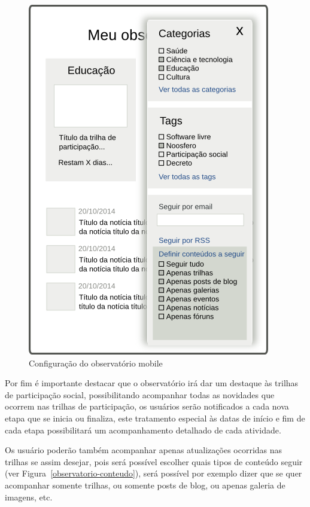\documentclass[12pt]{article}
\begin{document}
\begin{figure}[h!]
\center
\includegraphics[scale=0.50]{observatorio-mobile-opcoes.png}
\caption{Configuração do observatório mobile}
\label{observatorio-mobile-opcoes}
\end{figure}

Por fim é importante destacar que o observatório irá dar um destaque às
trilhas de participação social, possibilitando acompanhar todas as novidades
que ocorrem nas trilhas de participação, os usuários serão notificados a cada
nova etapa que se inicia ou finaliza, este tratamento especial às datas de
início e fim de cada etapa possibilitará um acompanhamento detalhado de cada
atividade.

Os usuário poderão também acompanhar apenas atualizações ocorridas nas trilhas
se assim desejar, pois será possível escolher quais tipos de conteúdo seguir
(ver Figura~\ref{observatorio-conteudo}), será possível por exemplo dizer que
se quer acompanhar somente trilhas, ou somente posts de blog, ou apenas
galeria de imagens, etc.
\end{document}
